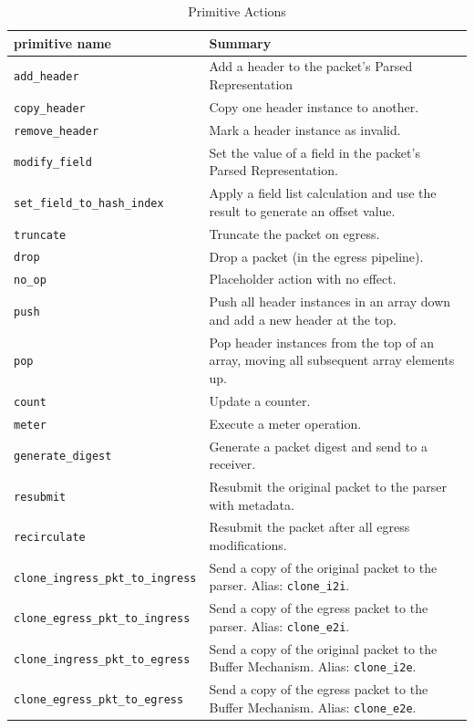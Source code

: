 \documentclass[12pt]{article}
\begin{document}
\begin{table}[H]
\begin{center}
\begin{tabular}{| l | p{} |} \hline
\textbf{primitive name} &
\textbf{Summary} \\ \hline
\texttt{add_header} &
Add a header to the packet's Parsed Representation \\ \hline
\texttt{copy_header} &
Copy one header instance to another. \\ \hline
\texttt{remove_header} &
Mark a header instance as invalid. \\ \hline
\texttt{modify_field} &
Set the value of a field in the packet's Parsed Representation. \\ \hline
\texttt{set_field_to_hash_index} &
Apply a field list calculation and use the result to generate an offset value. \\ \hline
\texttt{truncate} &
Truncate the packet on egress. \\ \hline
\texttt{drop} &
Drop a packet (in the egress pipeline). \\ \hline
\texttt{no_op} &
Placeholder action with no effect. \\ \hline
\texttt{push} &
Push all header instances in an array down and add a new header at the top. \\ \hline
\texttt{pop} &
Pop header instances from the top of an array, moving all subsequent array elements up. \\ \hline
\texttt{count} &
Update a counter. \\ \hline
\texttt{meter} &
Execute a meter operation. \\ \hline
\texttt{generate_digest} &
Generate a packet digest and send to a receiver. \\ \hline
\texttt{resubmit} &
Resubmit the original packet to the parser with metadata. \\ \hline
\texttt{recirculate} &
Resubmit the packet after all egress modifications. \\ \hline
\texttt{clone_ingress_pkt_to_ingress} &
Send a copy of the original packet to the parser. Alias: \texttt{clone_i2i}. \\ \hline
\texttt{clone_egress_pkt_to_ingress} &
Send a copy of the egress packet to the parser. Alias: \texttt{clone_e2i}. \\ \hline
\texttt{clone_ingress_pkt_to_egress} &
Send a copy of the original packet to the Buffer Mechanism. Alias: \texttt{clone_i2e}. \\ \hline
\texttt{clone_egress_pkt_to_egress} &
Send a copy of the egress packet to the Buffer Mechanism. Alias: \texttt{clone_e2e}. \\ \hline
\end{tabular}
\end{center}
\caption{Primitive Actions}
\label{tab:primitiveactions}
\end{table}
\end{document}
